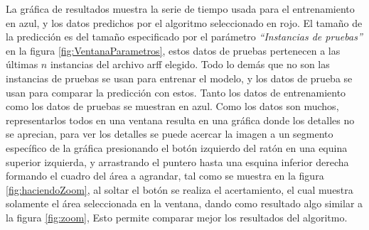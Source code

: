 La gráfica de resultados muestra la serie de tiempo usada para el entrenamiento en azul, y los datos predichos por el algoritmo seleccionado en rojo. El tamaño de la predicción es del tamaño especificado por el parámetro \textit{``Instancias de pruebas''} en la figura \ref{fig:VentanaParametros}, estos datos de pruebas pertenecen a las últimas $n$ instancias del archivo arff elegido. Todo lo demás que no son las instancias de pruebas se usan para entrenar el modelo, y los datos de prueba se usan para comparar la predicción con estos. Tanto los datos de entrenamiento como los datos de pruebas se muestran en azul.
Como los datos son muchos, representarlos todos en una ventana resulta en una gráfica donde los detalles no se aprecian, para ver los detalles se puede acercar la imagen a un segmento específico de la gráfica presionando el botón izquierdo del ratón en una equina superior izquierda, y arrastrando el puntero hasta una esquina inferior derecha formando el cuadro del área a agrandar, tal como se muestra en la figura \ref{fig:haciendoZoom}, al soltar el botón se realiza el acertamiento, el cual muestra solamente el área seleccionada en la ventana, dando como resultado algo similar a la figura \ref{fig:zoom}, Esto permite comparar mejor los resultados del algoritmo.

